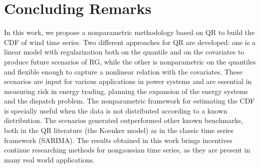 \section{Concluding Remarks}

In this work, we propose a nonparametric methodology based on QR to build the CDF of wind time series.  Two different approaches for QR are developed: one is a linear model with regularization both on the quantile and on the covariates to produce future scenarios of RG, while the other is nonparametric on the quantiles and flexible enough to capture a nonlinear relation with the covariates. These scenarios are input for various applications in power systems and are essential in measuring risk in energy trading, planning the expansion of the energy systems and the dispatch problem. The nonparametric framework for estimating the CDF is specially useful when the data is not distributed according to a known distribution. The scenarios generated outperformed other known benchmarks, both in the QR literature (the Koenker model) as in the classic time series framework (SARIMA). The results obtained in this work brings incentives continue researching methods for nongaussian time series, as they are present in many real world applications. 